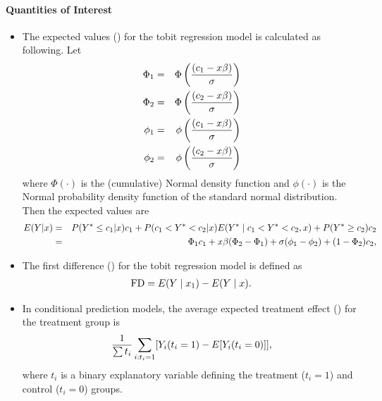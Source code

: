 \documentclass[letterpaper,10pt,english]{sphinxmanual}
\begin{document}
\paragraph{Quantities of Interest}
\label{zelig-tobitbayes:quantities-of-interest}\begin{itemize}
\item {} 
The expected values () for the tobit regression model is
calculated as following. Let
\begin{gather}
\begin{split}\begin{aligned}
\Phi_1 &=& \Phi\left(\frac{(c_1 - x \beta)}{\sigma}\right) \\
\Phi_2 &=& \Phi\left(\frac{(c_2 - x \beta)}{\sigma}\right) \\
\phi_1 &=& \phi\left(\frac{(c_1 - x \beta)}{\sigma}\right) \\
\phi_2 &=& \phi\left(\frac{(c_2 - x \beta)}{\sigma}\right) \end{aligned}\end{split}\notag
\end{gather}
where \(\Phi(\cdot)\) is the (cumulative) Normal density function
and \(\phi(\cdot)\) is the Normal probability density function of
the standard normal distribution. Then the expected values are
\begin{gather}
\begin{split}\begin{aligned}
E(Y|x) &=& P(Y^* \le c_1|x) c_1+P(c_1<Y^*<c_2|x) E(Y^* \mid c_1<Y^*<c_2, x)+P(Y^* \ge c_2) c_2 \\
   &=& \Phi_{1}c_1 + x \beta(\Phi_{2}-\Phi_{1}) + \sigma (\phi_1 -\phi_2) + (1-\Phi_2) c_2,\end{aligned}\end{split}\notag
\end{gather}
\item {} 
The first difference () for the tobit regression model is
defined as
\begin{gather}
\begin{split}\begin{aligned}
\text{FD}=E(Y\mid x_{1})-E(Y\mid x).\end{aligned}\end{split}\notag
\end{gather}
\item {} 
In conditional prediction models, the average expected treatment
effect () for the treatment group is
\begin{gather}
\begin{split}\begin{aligned}
\frac{1}{\sum t_{i}}\sum_{i:t_{i}=1}[Y_{i}(t_{i}=1)-E[Y_{i}(t_{i}=0)]],\end{aligned}\end{split}\notag
\end{gather}
where \(t_{i}\) is a binary explanatory variable defining the
treatment (\(t_{i}=1\)) and control (\(t_{i}=0\)) groups.

\end{itemize}
\end{document}
